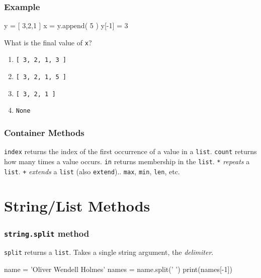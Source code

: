 \documentclass[11pt]{beamer}
\begin{document}
\begin{frame}[fragile]
  \frametitle{Example}
  \Enlarge

  \begin{semiverbatim}
y = [ 3,2,1 ]
x = y.append( 5 )
y[-1] = 3
  \end{semiverbatim}
  What is the final value of \texttt{x}?
  \begin{enumerate}[label=\Alph*]
  \item  \texttt{[ 3, 2, 1, 3 ]}
  \item  \texttt{[ 3, 2, 1, 5 ]}
  \item  \texttt{[ 3, 2, 1 ]}
  \item  \texttt{None}
  \end{enumerate}
\end{frame}

\begin{frame}[fragile]
  \frametitle{Container Methods}
  \Enlarge

  \begin{itemize}
  \myitem  \texttt{index} returns the index of the first occurrence of a value in a \texttt{list}.
  \myitem  \texttt{count} returns how many times a value occurs.
  \myitem  \texttt{in} returns membership in the \texttt{list}.
  \myitem  \texttt{*} \emph{repeats} a \texttt{list}.
  \myitem  \texttt{+} \emph{extends} a \texttt{list} (also \texttt{extend})..
  \myitem  \texttt{max}, \texttt{min}, \texttt{len}, etc.
  \end{itemize}
\end{frame}

\section{String/List Methods}

\begin{frame}[fragile]
  \frametitle{\texttt{string.split} method}
  \Enlarge

  \begin{itemize}
  \myitem  \texttt{split} returns a \texttt{list}. %
  \myitem  Takes a single string argument, the \emph{delimiter}. %
  \end{itemize}
  \begin{semiverbatim}
name = 'Oliver Wendell Holmes'
names = name.split(' ')
print(names[-1])
  \end{semiverbatim}
\end{frame}
\end{document}
